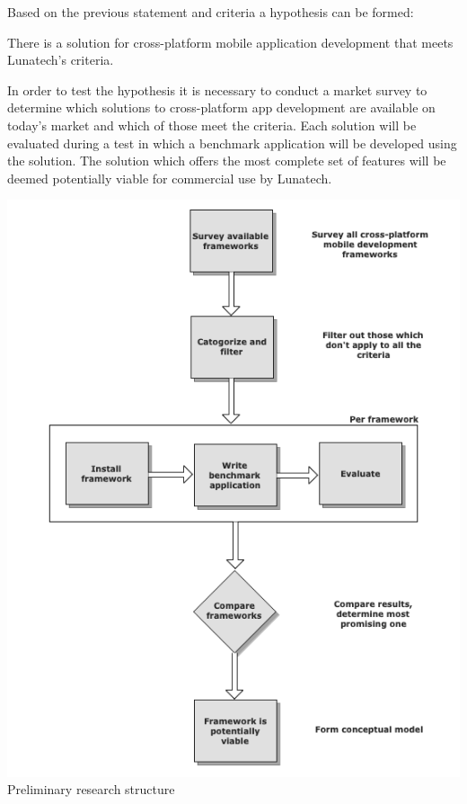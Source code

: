 Based on the previous statement and criteria a hypothesis can be formed:
\begin{shadequote}
There is a solution for cross-platform mobile application development that meets Lunatech's criteria.%
\end{shadequote}

In order to test the hypothesis it is necessary to conduct a market survey to determine which solutions to cross-platform app development are available on today's market and which of those meet the criteria. Each solution will be evaluated during a test in which a benchmark application will be developed using the solution. The solution which offers the most complete set of features will be deemed potentially viable for commercial use by Lunatech. 

\begin{centering}
\includegraphics[scale=0.6]{images/preliminary}\\{Preliminary research structure}\\
\end{centering}

